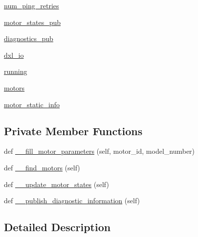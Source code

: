 \begin{DoxyCompactItemize}
\item 
\hyperlink{classdynamixel__driver_1_1dynamixel__serial__proxy_1_1_serial_proxy_a21fc78e1b743bf614d5f6c0aa7ba5bad}{num\+\_\+ping\+\_\+retries}
\item 
\hyperlink{classdynamixel__driver_1_1dynamixel__serial__proxy_1_1_serial_proxy_a0afcb1e7997542a7f588e6ec1c78734e}{motor\+\_\+states\+\_\+pub}
\item 
\hyperlink{classdynamixel__driver_1_1dynamixel__serial__proxy_1_1_serial_proxy_ad8c19469dec2b28c01724f6620c1daaf}{diagnostics\+\_\+pub}
\item 
\hyperlink{classdynamixel__driver_1_1dynamixel__serial__proxy_1_1_serial_proxy_af8d885fa9d6c2940405813a033ac41da}{dxl\+\_\+io}
\item 
\hyperlink{classdynamixel__driver_1_1dynamixel__serial__proxy_1_1_serial_proxy_af1bab57ffc79cc84203f00c831f466ce}{running}
\item 
\hyperlink{classdynamixel__driver_1_1dynamixel__serial__proxy_1_1_serial_proxy_ad6a31baac5dd24d901014a4d6cce5f42}{motors}
\item 
\hyperlink{classdynamixel__driver_1_1dynamixel__serial__proxy_1_1_serial_proxy_ab833c494b0c38713b3efaa0d4b0884cf}{motor\+\_\+static\+\_\+info}
\end{DoxyCompactItemize}
\subsection*{Private Member Functions}
\begin{DoxyCompactItemize}
\item 
def \hyperlink{classdynamixel__driver_1_1dynamixel__serial__proxy_1_1_serial_proxy_aa977afccc1b6a3280229dacaad5e31c4}{\+\_\+\+\_\+fill\+\_\+motor\+\_\+parameters} (self, motor\+\_\+id, model\+\_\+number)
\item 
def \hyperlink{classdynamixel__driver_1_1dynamixel__serial__proxy_1_1_serial_proxy_a04535b428c39167997ebafd304d7d835}{\+\_\+\+\_\+find\+\_\+motors} (self)
\item 
def \hyperlink{classdynamixel__driver_1_1dynamixel__serial__proxy_1_1_serial_proxy_ab99a3e324c25da6f4e67aa7618bbcab1}{\+\_\+\+\_\+update\+\_\+motor\+\_\+states} (self)
\item 
def \hyperlink{classdynamixel__driver_1_1dynamixel__serial__proxy_1_1_serial_proxy_a9526ac82eee9093f3362a22b0c56354e}{\+\_\+\+\_\+publish\+\_\+diagnostic\+\_\+information} (self)
\end{DoxyCompactItemize}


\subsection{Detailed Description}


